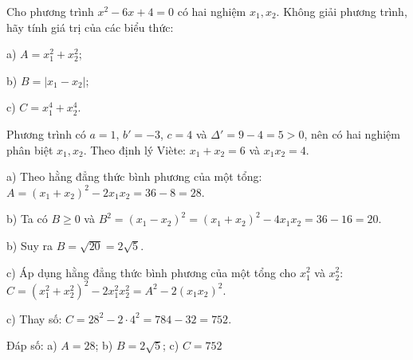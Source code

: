 \begin{problem}[9DS-PT2-043]
Cho phương trình $x^2 - 6x + 4 = 0$ có hai nghiệm $x_1, x_2$. Không giải phương trình, hãy tính giá trị của các biểu thức:

a) $A = x_1^2 + x_2^2$;

b) $B = |x_1 - x_2|$;

c) $C = x_1^4 + x_2^4$.

\begin{solution}
Phương trình có $a = 1$, $b' = -3$, $c = 4$ và $\Delta' = 9 - 4 = 5 > 0$, nên có hai nghiệm phân biệt $x_1, x_2$. Theo định lý Viète: $x_1 + x_2 = 6$ và $x_1x_2 = 4$.

a) Theo hằng đẳng thức bình phương của một tổng: $A = (x_1 + x_2)^2 - 2x_1x_2 = 36 - 8 = 28$.

b) Ta có $B \geq 0$ và $B^2 = (x_1 - x_2)^2 = (x_1 + x_2)^2 - 4x_1x_2 = 36 - 16 = 20$.

b) Suy ra $B = \sqrt{20} = 2\sqrt{5}$.

c) Áp dụng hằng đẳng thức bình phương của một tổng cho $x_1^2$ và $x_2^2$: $C = (x_1^2 + x_2^2)^2 - 2x_1^2x_2^2 = A^2 - 2(x_1x_2)^2$.

c) Thay số: $C = 28^2 - 2 \cdot 4^2 = 784 - 32 = 752$.

Đáp số: a) $\boxed{A = 28}$; b) $\boxed{B = 2\sqrt{5}}$; c) $\boxed{C = 752}$
\end{solution}
\end{problem}

